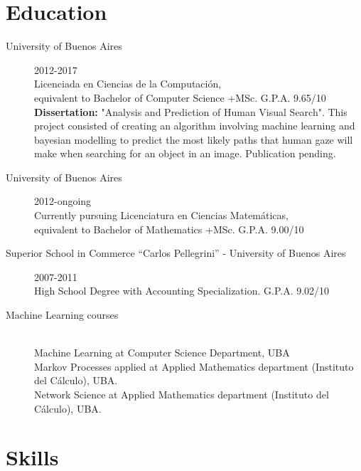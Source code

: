 \documentclass [a4paper, 11pt]{article}
\begin{document}
\section* {Education}
\begin{description}
  \item[University of Buenos Aires]{\hfill 2012-2017 \\
	Licenciada en Ciencias de la Computaci\'on, \\
	equivalent to Bachelor of Computer Science +MSc. G.P.A. 9.65/10 \\
    
    \textbf{Dissertation:} "Analysis and Prediction of Human Visual Search". This project consisted of creating an 
    algorithm involving machine learning and bayesian modelling to predict the most likely paths that 
    human gaze will make when searching for an object in an image. Publication pending.}

  \item[University of Buenos Aires]{\hfill 2012-ongoing \\ 
	Currently pursuing Licenciatura en Ciencias Matem\'aticas, \\
	equivalent to Bachelor of Mathematics +MSc. G.P.A. 9.00/10}
	
  \item[Superior School in Commerce ``Carlos Pellegrini'' - University of Buenos Aires] {\hfill 2007-2011 \\
	High School Degree with Accounting Specialization. G.P.A. 9.02/10}

  \item[Machine Learning courses] { \hfill \\
    Machine Learning at Computer Science Department, UBA \\ %
    Markov Processes applied at Applied Mathematics department (Instituto del C\'alculo), UBA. \\
    Network Science at Applied Mathematics department (Instituto del C\'alculo), UBA. \\
}

\end{description}


\section* {Skills}

\end{document}
